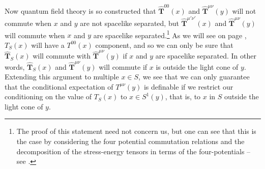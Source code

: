 \documentclass[12pt]{report}
\begin{document}
Now quantum field theory is so constructed that $\hat{\bm{T}}^{{00}}(x)$ and $\hat{\bm{T}}^{{\mu\nu}}(y)$ will not commute when $x$ and $y$ are not spacelike separated, but $\hat{\bm{T}}^{{\mu'\nu'}}(x)$ and $\hat{\bm{T}}^{{\mu\nu}}(y)$ will commute when $x$ and $y$ are spacelike separated.\footnote{The proof of this statement need not concern us, but one can see that this is the case by considering the four potential commutation relations and the decomposition of the stress-energy tensors in terms of the four-potentials  -- see \cite[p. 1443--1444]{SchwingerJulianI}.} As we will see on page \pageref{TSdef}, $T_S(x)$ will have a $T^{00}(x)$ component, and so we can only be sure that $\hat{\bm{T}}_S(x)$ will commute with  $\hat{\bm{T}}^{{\mu\nu}}(y)$ if $x$ and $y$ are spacelike separated. In other words, $\hat{\bm{T}}_S(x)$ and $\hat{\bm{T}}^{{\mu\nu}}(y)$ will commute if $x$ is outside the light cone of $y$. Extending this argument to multiple $x\in S$, we see that we can only guarantee that the conditional expectation of $T^{\mu\nu}(y)$ is definable if we restrict our conditioning on the value of $T_S(x)$ to $x\in S^1(y)$, that is, to $x$ in $S$ outside the light cone of $y$.
\end{document}
